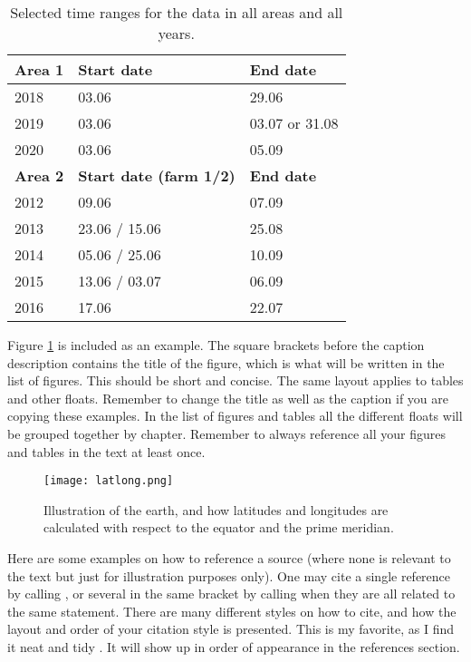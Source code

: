 \begin{table}[ht!]
\centering
    \begin{tabular}{ m{3cm} m{5cm} m{3cm} } 
    \toprule
    \toprule
    \textbf{Area 1} & \textbf{Start date} & \textbf{End date} \\
    \midrule
    2018    & 03.06    & 29.06                       \\[1.3ex]
    2019    & 03.06    & 03.07 or 31.08\footnotemark \\[1.3ex]
    2020    & 03.06    & 05.09                       \\[1.3ex]
    \midrule
    \textbf{Area 2} & \textbf{Start date (farm 1/2)} & \textbf{End date} \\
    \midrule
    2012    & 09.06            & 07.09               \\[1.3ex]
    2013    & 23.06 / 15.06    & 25.08               \\[1.3ex]
    2014    & 05.06 / 25.06    & 10.09               \\[1.3ex]
    2015    & 13.06 / 03.07    & 06.09               \\[1.3ex]
    2016    & 17.06            & 22.07               \\[1.3ex]
    \bottomrule
    \bottomrule
    \end{tabular}
\caption[Selected time ranges for all data]{Selected time ranges for the data in all areas and all years.}
\label{table:time_ranges}
\end{table}




Figure \ref{fig:latlong} is included as an example. The square brackets before the caption description contains the title of the figure, which is what will be written in the list of figures. This should be short and concise. The same layout applies to tables and other floats. Remember to change the title as well as the caption if you are copying these examples. In the list of figures and tables all the different floats will be grouped together by chapter. Remember to always reference all your figures and tables in the text at least once.

\begin{figure}[H]
  \centering
  \texttt{[image: latlong.png]}
  \caption[Illustration of latitude and longitude]{Illustration of the earth, and how latitudes and longitudes are calculated with respect to the equator and the prime meridian.}
  \label{fig:latlong}
\end{figure}


Here are some examples on how to reference a source (where none is relevant to the text but just for illustration purposes only). One may cite a single reference by calling \cite{wolves_of_mount_mckinley}, or several in the same bracket by calling \cite{machine_learning, clustering_impossibility} when they are all related to the same statement. There are many different styles on how to cite, and how the layout and order of your citation style is presented. This is my favorite, as I find it neat and tidy \cite{sheep}. It will show up in order of appearance in the references section.